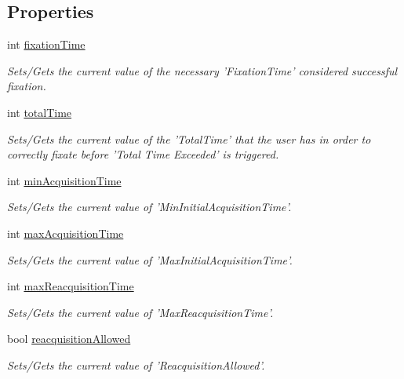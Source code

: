 \subsection*{Properties}
\begin{DoxyCompactItemize}
\item 
int \hyperlink{class_picto_1_1_target_controller_a235f39ddeb435249edc90c4ecd9752d2}{fixation\-Time}
\begin{DoxyCompactList}\small\item\em Sets/\-Gets the current value of the necessary 'Fixation\-Time' considered successful fixation. \end{DoxyCompactList}\item 
int \hyperlink{class_picto_1_1_target_controller_aea2309b5882ce95be4712e93d1b3db23}{total\-Time}
\begin{DoxyCompactList}\small\item\em Sets/\-Gets the current value of the 'Total\-Time' that the user has in order to correctly fixate before 'Total Time Exceeded' is triggered. \end{DoxyCompactList}\item 
int \hyperlink{class_picto_1_1_target_controller_af01d5d25f96ea79072310f7ce36d55d9}{min\-Acquisition\-Time}
\begin{DoxyCompactList}\small\item\em Sets/\-Gets the current value of 'Min\-Initial\-Acquisition\-Time'. \end{DoxyCompactList}\item 
int \hyperlink{class_picto_1_1_target_controller_a46d2f73fe5b79a70c39a97976c9e38e6}{max\-Acquisition\-Time}
\begin{DoxyCompactList}\small\item\em Sets/\-Gets the current value of 'Max\-Initial\-Acquisition\-Time'. \end{DoxyCompactList}\item 
int \hyperlink{class_picto_1_1_target_controller_abedf5945d75df7b30414bfaf6dff6dc5}{max\-Reacquisition\-Time}
\begin{DoxyCompactList}\small\item\em Sets/\-Gets the current value of 'Max\-Reacquisition\-Time'. \end{DoxyCompactList}\item 
bool \hyperlink{class_picto_1_1_target_controller_a2ebc5e6938143b689fea1375e4dbac60}{reacquisition\-Allowed}
\begin{DoxyCompactList}\small\item\em Sets/\-Gets the current value of 'Reacquisition\-Allowed'. \end{DoxyCompactList}\end{DoxyCompactItemize}
